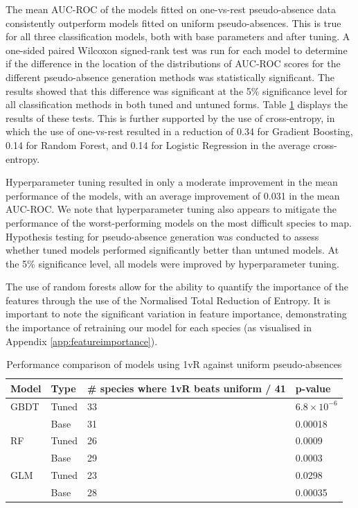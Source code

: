 \documentclass{article}
\begin{document}

The mean AUC-ROC of the models fitted on one-vs-rest pseudo-absence data consistently outperform models fitted on uniform pseudo-absences. This is true for all three classification models, both with base parameters and after tuning. A one-sided paired Wilcoxon signed-rank test \cite{Wilcoxon} was run for each model to determine if the difference in the location of the distributions of AUC-ROC scores for the different pseudo-absence generation methods was statistically significant. The results showed that this difference was significant at the 5\% significance level for all classification methods in both tuned and untuned forms. Table \ref{table:results} displays the results of these tests. This is further supported by the use of cross-entropy, in which the use of one-vs-rest resulted in a reduction of 0.34 for Gradient Boosting, 0.14 for Random Forest, and 0.14 for Logistic Regression in the average cross-entropy. 

Hyperparameter tuning resulted in only a moderate improvement in the mean performance of the models, with an average improvement of 0.031 in the mean AUC-ROC. We note that hyperparameter tuning also appears to mitigate the performance of the worst-performing models on the most difficult species to map. Hypothesis testing for pseudo-absence generation was conducted to assess whether tuned models performed significantly better than untuned models. At the 5\% significance level, all models were improved by hyperparameter tuning.

The use of random forests allow for the ability to quantify the importance of the features through the use of the Normalised Total Reduction of Entropy. It is important to note the significant variation in feature importance, demonstrating the importance of retraining our model for each species (as visualised in Appendix \ref{app:featureimportance}).


\begin{table}[h!]
\centering
\begin{tabular}{|l|l|l|l|}
\hline
Model & Type & \# species where 1vR beats uniform / 41 & p-value \\ \hline
GBDT & Tuned & 33 & $6.8 \times 10^{-6}$ \\ \hline
     & Base  & 31 & 0.00018 \\ \hline
RF   & Tuned & 26 & 0.0009 \\ \hline
     & Base  & 29 & 0.0003 \\ \hline
GLM  & Tuned & 23 & 0.0298 \\ \hline
     & Base  & 28 & 0.00035 \\ \hline
\end{tabular}
\vspace{6pt}  
\caption{Performance comparison of models using 1vR against uniform pseudo-absences}
\label{table:results}
\end{table}
\end{document}
